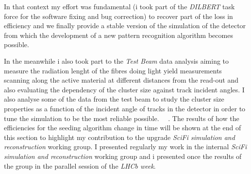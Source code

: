 \documentclass[paper=a4, fontsize=10pt]{scrartcl}
\numberwithin{equation}{section}		%
\numberwithin{figure}{section}			%
\numberwithin{table}{section}				%
\begin{document}
\begin{itemize}
In that context my effort was fundamental (i took part of the \textit{DILBERT} task force for the software fixing and bug correction) to recover part of the loss in efficiency and we finally provide a stable version of the simulation of the detector from which the development of a new pattern recognition algorithm becomes possible. 

In the meanwhile i also took part to the \textit{Test Beam} data analysis aiming to measure the radiation lenght of the fibres doing light yield measurements scanning along the active material at different distances from the read-out and also evaluating the dependency of the cluster size against track incident angles. I also analyse some of the data from the test beam to study the cluster size properties as a function of the incident angle of tracks in the detector in order to tune the simulation to be the most reliable possible. ~\cite{AnalysisOrsay}~\cite{LalTestBeam}.
The results of how the efficiencies for the seeding algorithm change in time will be shown at the end of this section to highlight my contribution to the upgrade \textit{SciFi simulation and reconstruction} working group. I presented regularly my work in the internal \textit{SciFi simulation and reconstruction} working group and i presented once the results of the group in the parallel session of the \textit{LHCb week}. 


\end{itemize}
\end{document}
